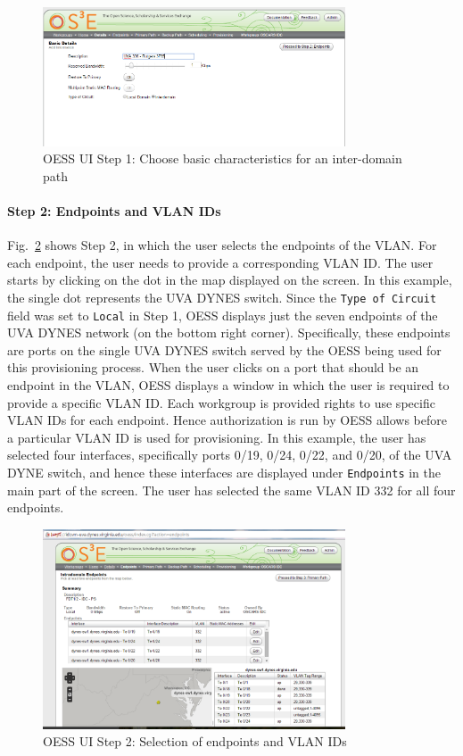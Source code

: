 \begin{figure}[htb!]
\centering
\includegraphics[width=0.8\textwidth]{figures/oess-basic2.png}
\caption{OESS UI Step 1: Choose basic characteristics for an inter-domain path}
\label{fig:oessbasic-interdomain}
\end{figure}



\paragraph{Step 2: Endpoints and VLAN IDs}
Fig.~\ref{fig:oesspoints} shows Step 2, in which the user selects the endpoints of the VLAN.
For each endpoint, the user needs to provide a corresponding VLAN ID. The user starts by clicking on the dot in the map displayed on the screen. In this example, the single dot represents the UVA DYNES switch. Since the \texttt{Type of Circuit} field was set to \texttt{Local} in Step 1,
OESS displays just the seven endpoints of the UVA DYNES network (on the bottom right corner). Specifically, these endpoints are ports on the single UVA DYNES switch served by the OESS being used for this provisioning process. When the user clicks on a port that should be an endpoint in the VLAN, OESS displays a window in which the user is required to provide a specific VLAN ID. Each workgroup is provided rights to use specific VLAN IDs for each endpoint. Hence
authorization is run by OESS allows before a particular VLAN ID is used for provisioning. In this
example, the user has selected four interfaces, specifically ports 0/19, 0/24, 0/22, and 0/20,
of the UVA DYNE switch,
and hence these interfaces are displayed under \texttt{Endpoints} in the main part of the screen.
The user has selected the same VLAN ID 332 for all four endpoints.
\begin{figure}[htb!]
\centering
\includegraphics[width=0.8\textwidth]{figures/oess-points.png}
\caption{OESS UI Step 2: Selection of endpoints and VLAN IDs}
\label{fig:oesspoints}
\end{figure}

